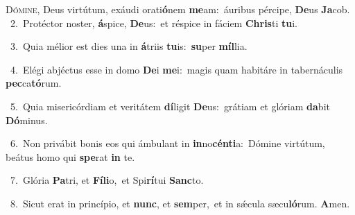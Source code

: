\lettrine{\initial\textcolor{\initialcolor}{D}}{ómine,} Deus virtútum, exáudi orati\-\textbf{ó}\-nem \textbf{me}\-am:~\star áuribus pércipe, \textbf{De}\-us \textbf{Ja}\-cob.\\
{\numbfont\textcolor{\numbcolor}{~2.}}~Protéctor noster, \textbf{á}\-spice, \textbf{De}\-us:~\star et réspice in fáciem \textbf{Chris}\-ti \textbf{tu}\-i.\par
{\numbfont\textcolor{\numbcolor}{~3.}}~Quia mélior est dies una in \textbf{á}\-triis \textbf{tu}\-is:~\star \textbf{su}\-per \textbf{míl}\-lia.\par
{\numbfont\textcolor{\numbcolor}{~4.}}~Elégi abjéctus esse in domo \textbf{De}\-i \textbf{me}\-i:~\star magis quam habitáre in tabernáculis \textbf{pec}\-ca\-\textbf{tó}\-rum.\par
{\numbfont\textcolor{\numbcolor}{~5.}}~Quia misericórdiam et veritátem \textbf{dí}\-ligit \textbf{De}\-us:~\star grátiam et glóriam \textbf{da}\-bit \textbf{Dó}\-minus.\par
{\numbfont\textcolor{\numbcolor}{~6.}}~Non privábit bonis eos qui ámbulant in \textbf{in}\-no\-\textbf{cén}\-\textbf{ti}a:~\star Dómine virtútum, beátus homo qui \textbf{spe}\-rat \textbf{in} te.\par
{\numbfont\textcolor{\numbcolor}{~7.}}~Glória \textbf{Pa}\-tri, et \textbf{Fí}\-\textbf{li}o,~\star et Spi\-\textbf{rí}\-tui \textbf{Sanc}\-to.\par
{\numbfont\textcolor{\numbcolor}{~8.}}~Sicut erat in princípio, et \textbf{nunc}\-, et \textbf{sem}\-per,~\star et in sǽcula sæcu\-\textbf{ló}\-rum. \textbf{A}\-men.\par
